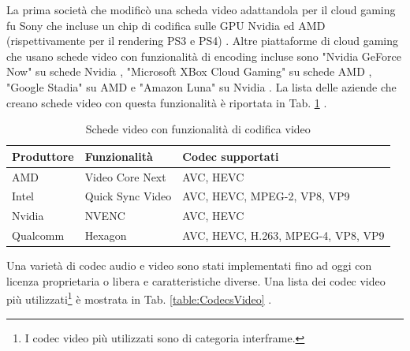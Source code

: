 La prima società che modificò una scheda video adattandola per il cloud gaming fu Sony che incluse un chip di codifica sulle GPU Nvidia ed AMD (rispettivamente per il rendering PS3 e PS4) \parencite{PlayStation_Now_Chip}. Altre piattaforme di cloud gaming che usano schede video con funzionalità di encoding incluse sono "Nvidia GeForce Now" su schede Nvidia \parencite{GeForce_Now}, "Microsoft XBox Cloud Gaming" su schede AMD \parencite{xCloudBlade}, "Google Stadia" su AMD \parencite{Google_Stadia_Server} e "Amazon Luna" su Nvidia \parencite{Amazon_Luna_GPU}. La lista delle aziende che creano schede video con questa funzionalità è riportata in Tab. \ref{table:VideoCardEncodingFeature} \parencite{GCNArchitecture} \parencite{IntelQuickSyncVideo} \parencite{NVIDIAVideoCodecSDK} \parencite{Hexagon_DSP_SDK}.

\begin{table}[H]
	\centering
	\begin{tabular}{||l l l||} 
		\hline
		Produttore & Funzionalità & Codec supportati \\
		\hline\hline
		AMD & Video Core Next & AVC, HEVC \\
		\hline
		Intel & Quick Sync Video & AVC, HEVC, MPEG-2, VP8, VP9 \\
		\hline
		Nvidia & NVENC & AVC, HEVC \\
		\hline
		Qualcomm & Hexagon & AVC, HEVC, H.263, MPEG-4, VP8, VP9 \\
		\hline
	\end{tabular}

	\caption{Schede video con funzionalità di codifica video}
	\label{table:VideoCardEncodingFeature}
\end{table}

Una varietà di codec audio e video sono stati implementati fino ad oggi con licenza proprietaria o libera e caratteristiche diverse. Una lista dei codec video più utilizzati\footnote{I codec video più utilizzati sono di categoria interframe.} è mostrata in Tab. \ref{table:CodecsVideo} \parencite{WebVideoCodecGuide}.

